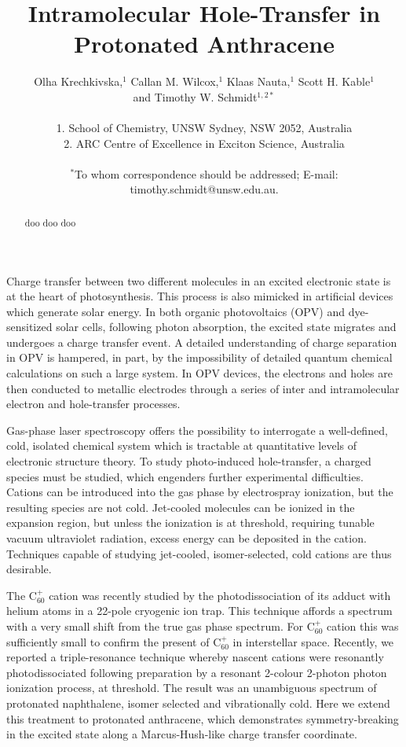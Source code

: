 \documentclass[12pt]{article}
\title{Intramolecular Hole-Transfer in Protonated Anthracene}
\author
{Olha Krechkivska,$^{1}$ Callan M. Wilcox,$^{1}$ Klaas Nauta,$^{1}$ Scott H. Kable$^{1}$\\
and Timothy W. Schmidt$^{1,2\ast}$\\
\\
\normalsize{1. School of Chemistry, UNSW Sydney, NSW 2052, Australia}\\
\normalsize{2. ARC Centre of Excellence in Exciton Science, Australia}\\
\\
\normalsize{$^\ast$To whom correspondence should be addressed; E-mail:  timothy.schmidt@unsw.edu.au.}
}
\date{}
\begin{document}
\baselineskip24pt

\maketitle

\begin{abstract}
doo doo doo
\end{abstract}

\newpage
Charge transfer between two different molecules in an excited electronic state is at the heart of photosynthesis. This process is also mimicked in artificial devices which generate solar energy. In both organic photovoltaics (OPV) and dye-sensitized solar cells, following photon absorption, the excited state migrates and undergoes a charge transfer event. A detailed understanding of charge separation in OPV is hampered, in part, by the impossibility of detailed quantum chemical calculations on such a large system. In OPV devices, the electrons and holes are then conducted to metallic electrodes through a series of inter and intramolecular electron and hole-transfer processes.

Gas-phase laser spectroscopy offers the possibility to interrogate a well-defined, cold, isolated chemical system which is tractable at quantitative levels of electronic structure theory. To study photo-induced hole-transfer, a charged species must be studied, which engenders further experimental difficulties. Cations can be introduced into the gas phase by electrospray ionization, but the resulting species are not cold. Jet-cooled molecules can be ionized in the expansion region, but unless the ionization is at threshold, requiring tunable vacuum ultraviolet radiation, excess energy can be deposited in the cation. Techniques capable of studying jet-cooled, isomer-selected, cold cations are thus desirable.

The C$_{60}^+$ cation was recently studied by the photodissociation of its adduct with helium atoms in a 22-pole cryogenic ion trap. This technique affords a spectrum with a very small shift from the true gas phase spectrum. For C$_{60}^+$ cation this was sufficiently small to confirm the present of C$_{60}^+$ in interstellar space. Recently, we reported a triple-resonance technique whereby nascent cations were resonantly photodissociated following preparation by a resonant 2-colour 2-photon photon ionization process, at threshold. The result was an unambiguous spectrum of protonated naphthalene, isomer selected and vibrationally cold. Here we extend this treatment to protonated anthracene, which demonstrates symmetry-breaking in the excited state along a Marcus-Hush-like charge transfer coordinate.
\end{document}
